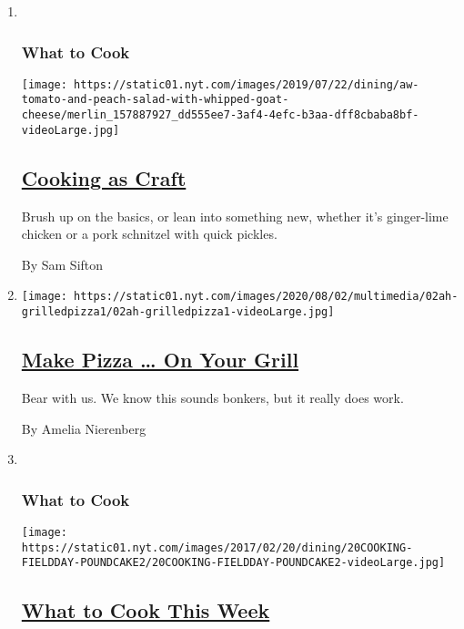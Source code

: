 \begin{enumerate}
\def\labelenumi{\arabic{enumi}.}
\item ~
  \hypertarget{what-to-cook}{%
  \subsubsection{What to Cook}\label{what-to-cook}}

  \texttt{[image: https://static01.nyt.com/images/2019/07/22/dining/aw-tomato-and-peach-salad-with-whipped-goat-cheese/merlin\_157887927\_dd555ee7-3af4-4efc-b3aa-dff8cbaba8bf-videoLarge.jpg]}

  \hypertarget{cooking-as-craft}{%
  \subsection{\texorpdfstring{\href{/2020/08/03/dining/cooking-as-craft.html}{Cooking
  as Craft}}{Cooking as Craft}}\label{cooking-as-craft}}

  Brush up on the basics, or lean into something new, whether it's
  ginger-lime chicken or a pork schnitzel with quick pickles.

  By Sam Sifton
\item
  \texttt{[image: https://static01.nyt.com/images/2020/08/02/multimedia/02ah-grilledpizza1/02ah-grilledpizza1-videoLarge.jpg]}

  \hypertarget{make-pizza--on-your-grill}{%
  \subsection{\texorpdfstring{\href{/2020/08/01/at-home/coronavirus-make-pizza-on-a-grill.html}{Make
  Pizza \ldots{} On Your
  Grill}}{Make Pizza \ldots{} On Your Grill}}\label{make-pizza--on-your-grill}}

  Bear with us. We know this sounds bonkers, but it really does work.

  By Amelia Nierenberg
\item ~
  \hypertarget{what-to-cook-1}{%
  \subsubsection{What to Cook}\label{what-to-cook-1}}

  \texttt{[image: https://static01.nyt.com/images/2017/02/20/dining/20COOKING-FIELDDAY-POUNDCAKE2/20COOKING-FIELDDAY-POUNDCAKE2-videoLarge.jpg]}

  \hypertarget{what-to-cook-this-week}{%
  \subsection{\texorpdfstring{\href{/2020/08/02/dining/what-to-cook-this-week.html}{What
  to Cook This
  Week}}{What to Cook This Week}}\label{what-to-cook-this-week}}


\end{enumerate}
